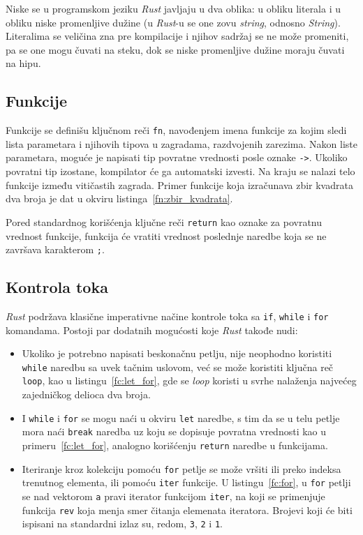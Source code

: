 \documentclass[12pt,oneside]{memoir}
\begin{document}
Niske se u programskom jeziku \emph{Rust} javljaju u dva oblika:
u obliku literala i u obliku niske promenljive dužine
(u \emph{Rust}-u se one zovu \emph{string}, odnosno \emph{String}).
Literalima se veličina zna pre kompilacije i njihov sadržaj se ne može promeniti,
pa se one mogu čuvati na steku, dok se niske promenljive dužine moraju čuvati na hipu.

\subsection{Funkcije}
Funkcije se definišu ključnom reči \texttt{fn}, navođenjem imena funkcije za kojim sledi
lista parametara i njihovih tipova u zagradama, razdvojenih zarezima. Nakon liste parametara,
moguće je napisati tip povratne vrednosti posle oznake \texttt{->}. Ukoliko povratni tip izostane,
kompilator će ga automatski izvesti. Na kraju se nalazi telo funkcije između vitičastih zagrada.
Primer funkcije koja izračunava zbir kvadrata dva broja je dat u okviru listinga~\ref{fn:zbir_kvadrata}.



\noindent
Pored standardnog korišćenja ključne reči \texttt{return} kao oznake za povratnu vrednost funkcije,
funkcija će vratiti vrednost poslednje naredbe koja se ne završava karakterom \texttt{;}.

\subsection{Kontrola toka}
\emph{Rust} podržava klasične imperativne načine kontrole toka sa \texttt{if},
\texttt{while} i \texttt{for} komandama. Postoji par dodatnih mogućosti
koje \emph{Rust} takođe nudi:

\begin{itemize}
  \item Ukoliko je potrebno napisati beskonačnu petlju, nije neophodno koristiti
        \texttt{while} naredbu sa uvek tačnim uslovom, već se može koristiti
        ključna reč \texttt{loop}, kao u listingu~\ref{fc:let_for}, gde se
        \emph{loop} koristi u svrhe nalaženja najvećeg zajedničkog delioca
        dva broja.
  \item I \texttt{while} i \texttt{for} se mogu naći u okviru \texttt{let}
        naredbe, s tim da se u telu petlje mora naći \texttt{break} naredba
        uz koju se dopisuje povratna vrednosti kao u primeru~\ref{fc:let_for},
        analogno korišćenju \texttt{return}
        naredbe u funkcijama.
  \item Iteriranje kroz kolekciju pomoću \texttt{for} petlje se može vršiti ili
        preko indeksa trenutnog elementa, ili pomoću \texttt{iter} funkcije.
        U listingu~\ref{fc:for}, u \texttt{for} petlji se nad
        vektorom \texttt{a} pravi iterator funkcijom \texttt{iter},
        na koji se primenjuje funkcija \texttt{rev} koja
        menja smer čitanja elemenata iteratora. Brojevi
        koji će biti ispisani na standardni izlaz su, redom, \texttt{3},
        \texttt{2} i \texttt{1}.
\end{itemize}
\end{document}
